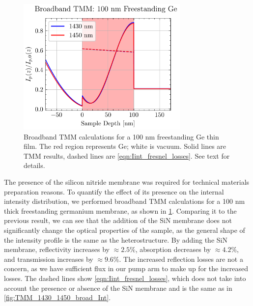 \begin{figure}
	\centering
	\includegraphics[width=0.75\textwidth]{figures/chap4/Ge_1430_1450_broad_Int.pdf}
	\caption{Broadband TMM calculations for a {100 nm} freestanding Ge thin film. The red region represents Ge; white is vacuum. Solid lines are TMM results, dashed lines are \cref{eqn:Iint_fresnel_losses}. See text for details.}
	\label{fig:Ge_1430_1450_broad_Int}
\end{figure}

The presence of the silicon nitride membrane was required for technical materials preparation reasons. To quantify the effect of its presence on the internal intensity distribution, we performed broadband TMM calculations for a 100 nm thick freestanding germanium membrane, as shown in \cref{fig:Ge_1430_1450_broad_Int}. Comparing it to the previous result, we can see that the addition of the SiN membrane does not significantly change the optical properties of the sample, as the general shape of the intensity profile is the same as the heterostructure. By adding the SiN membrane, reflectivity increases by $\approx 2.5\%$, absorption decreases by $\approx 4.2\%$, and transmission increases by $\approx 9.6\%$. The increased reflection losses are not a concern, as we have sufficient flux in our pump arm to make up for the increased losses. The dashed lines show \cref{eqn:Iint_fresnel_losses}, which does not take into account the presence or absence of the SiN membrane and is the same as in \cref{fig:TMM_1430_1450_broad_Int}.

